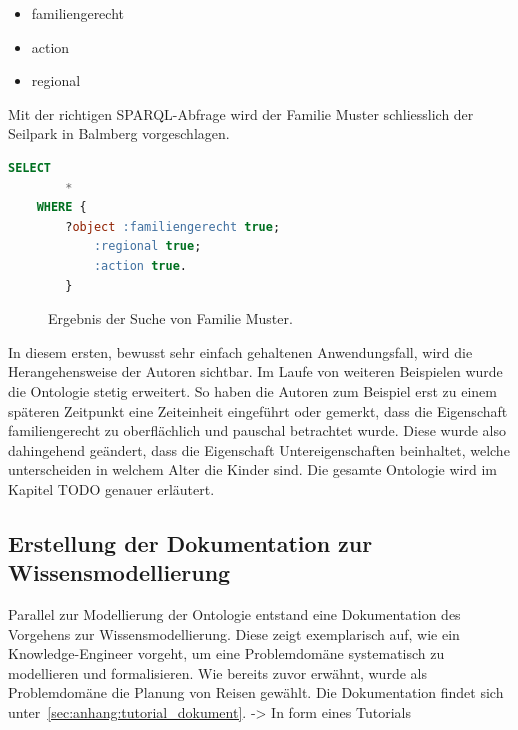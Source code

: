 \begin{itemize}
		\item familiengerecht
		\item action
		\item regional
\end{itemize}

Mit der richtigen SPARQL-Abfrage wird der Familie Muster schliesslich der Seilpark in Balmberg vorgeschlagen.

\begin{lstlisting}[caption={SPARQL-Abfrage um familiengerechte, regionale und actionreiche Ausflüge zu finden.},captionpos=b,language=SQL]
    SELECT
        *
    WHERE {
        ?object :familiengerecht true;
            :regional true;
            :action true.
        }
\end{lstlisting}


\begin{figure}[H]
\centering {}
\caption{Ergebnis der Suche von Familie Muster.\label{fig:famMusterOutput}\protect\footnotemark}
\end{figure}

In diesem ersten, bewusst sehr einfach gehaltenen Anwendungsfall, wird die Herangehensweise der Autoren sichtbar. Im Laufe von weiteren Beispielen wurde die Ontologie stetig erweitert. So haben die Autoren zum Beispiel erst zu einem späteren Zeitpunkt eine Zeiteinheit eingeführt oder gemerkt, dass die Eigenschaft familiengerecht zu oberflächlich und pauschal betrachtet wurde. Diese wurde also dahingehend geändert, dass die Eigenschaft Untereigenschaften beinhaltet, welche unterscheiden in welchem Alter die Kinder sind. Die gesamte Ontologie wird im Kapitel {\color{red} TODO} genauer erläutert.

\subsection{Erstellung der Dokumentation zur Wissensmodellierung}
\label{subsec:dokumentation_wissensmodellierung}
Parallel zur Modellierung der Ontologie entstand eine Dokumentation des Vorgehens zur Wissensmodellierung. Diese zeigt exemplarisch auf, wie ein Knowledge-Engineer vorgeht, um eine Problemdomäne systematisch zu modellieren und formalisieren. Wie bereits zuvor erwähnt, wurde als Problemdomäne die Planung von Reisen gewählt. Die Dokumentation findet sich unter~\autoref{sec:anhang:tutorial_dokument}. -> In form eines Tutorials 

